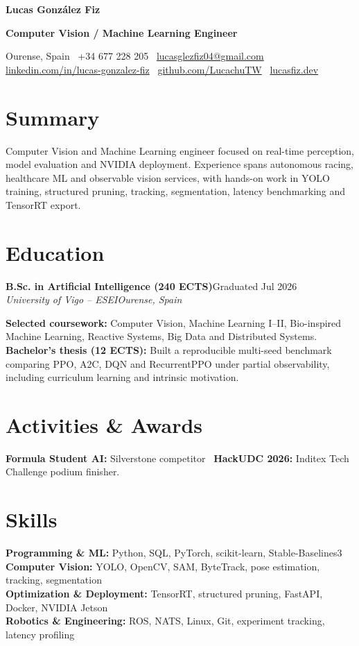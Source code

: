 \documentclass[10pt,a4paper]{article}
\newcommand{\entry}[4]{
  \textbf{#1}\hfill{\small #2}\\[-1pt]
  \textit{#3}\hfill{\small\textit{#4}}\par\vspace{-1.5pt}
}
\begin{document}
{\fontsize{26.5pt}{28pt}\selectfont\bfseries\color{ink} Lucas Gonz\'alez Fiz}\par
\vspace{1pt}
{\fontsize{12.5pt}{14pt}\selectfont\bfseries\color{accent} Computer Vision / Machine Learning Engineer}\par
\vspace{3pt}
{\small
Ourense, Spain \textbar\ +34 677 228 205 \textbar\
\href{mailto:lucasglezfiz04@gmail.com}{lucasglezfiz04@gmail.com}\\[-1pt]
\href{https://linkedin.com/in/lucas-gonzalez-fiz}{linkedin.com/in/lucas-gonzalez-fiz} \textbar\
\href{https://github.com/LucachuTW}{github.com/LucachuTW} \textbar\
\href{https://lucasfiz.dev}{lucasfiz.dev}
}

\section{Summary}
Computer Vision and Machine Learning engineer focused on real-time perception, model evaluation and NVIDIA deployment. Experience spans autonomous racing, healthcare ML and observable vision services, with hands-on work in YOLO training, structured pruning, tracking, segmentation, latency benchmarking and TensorRT export.

\section{Education}
\entry{B.Sc. in Artificial Intelligence (240 ECTS)}{Graduated Jul 2026}{University of Vigo -- ESEI}{Ourense, Spain}
\textbf{Selected coursework:} Computer Vision, Machine Learning I--II, Bio-inspired Machine Learning, Reactive Systems, Big Data and Distributed Systems.\\[-1pt]
\textbf{Bachelor's thesis (12 ECTS):} Built a reproducible multi-seed benchmark comparing PPO, A2C, DQN and RecurrentPPO under partial observability, including curriculum learning and intrinsic motivation.\\[-1pt]
\section{Activities \& Awards}
\textbf{Formula Student AI:} Silverstone competitor \textbar\ \textbf{HackUDC 2026:} Inditex Tech Challenge podium finisher.

\section{Skills}
\textbf{Programming \& ML:} Python, SQL, PyTorch, scikit-learn, Stable-Baselines3\\
\textbf{Computer Vision:} YOLO, OpenCV, SAM, ByteTrack, pose estimation, tracking, segmentation\\
\textbf{Optimization \& Deployment:} TensorRT, structured pruning, FastAPI, Docker, NVIDIA Jetson\\
\textbf{Robotics \& Engineering:} ROS, NATS, Linux, Git, experiment tracking, latency profiling
\end{document}

